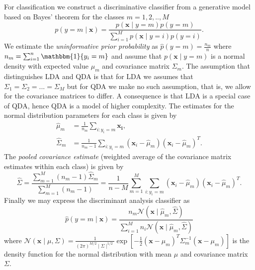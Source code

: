 \documentclass[../../project.tex]{subfiles}
\begin{document}
	For classification we construct a discriminative classifier from a generative model based on Bayes' theorem for the classes $m=1,2,..,M$
	\begin{equation}
	p(y=m \mid \boldsymbol{x}) = \frac{ p(\boldsymbol{x} \mid y=m) p(y=m)}
	{\sum_{i=1}^{M} p(\boldsymbol{x} \mid y=i)p(y=i)}.
	\end{equation}
	We estimate the \textit{uninformative prior probability} as $\hat{p}(y=m) = \frac{n_m}{n}$ where $n_m = \sum_{i=1}^{n} \mathbbm{1}\{y_i=m\}$ and assume that $p(\boldsymbol{x} \mid y=m)$ is a normal density with expected value $\mu_m$ and covariance matrix $\Sigma_m$. The assumption that distinguishes LDA and QDA is that for LDA we assumes that $\Sigma_1=\Sigma_2=...=\Sigma_M$ but for QDA we make no such assumption, that is, we allow for the covariance matrices to differ. A consequence is that LDA is a special case of QDA, hence QDA is a model of higher complexity. The estimates for the normal distribution parameters for each class is given by
	\begin{align}
	\hat{\mu}_m &= \frac{1}{n_m} \sum_{i:y_i=m} \boldsymbol{x_i}, \\
	\hat{\Sigma}_m &= \frac{1}{n_m-1}\sum_{i:y_i=m} (\boldsymbol{x}_i-\hat{\mu}_m)(\boldsymbol{x}_i-\hat{\mu}_m)^T.
	\end{align}
	The \textit{pooled covariance estimate} (weighted average of the covariance matrix estimates within each class) is given by
	\begin{equation}
	\hat{\Sigma} = \frac{\sum_{m=1}^{M} (n_m-1)\hat{\Sigma}_m}{\sum_{m=1}^{M} (n_m-1)}=\frac{1}{n-M}\sum_{m=1}^{M}\sum_{i:y_i=m} (\boldsymbol{x}_i-\hat{\mu}_m)(\boldsymbol{x}_i-\hat{\mu}_m)^T.
	\end{equation}
	Finally we may express the discriminant analysis classifier as
	\begin{equation}
	\hat{p}(y=m \mid \boldsymbol{x}) = \frac{n_m\mathcal{N}(\boldsymbol{x} \mid \hat{\mu}_m, \hat{\Sigma})}{\sum_{i=1}^{M} n_i\mathcal{N}(\boldsymbol{x} \mid \hat{\mu}_m, \hat{\Sigma})}
	\end{equation}
	where $\mathcal{N}(\boldsymbol{x} \mid \mu,\Sigma)=\frac{1}{(2\pi)^{M/2}\mid\Sigma\mid^{1/2}}\exp{[-\frac{1}{2}(\boldsymbol{x}-\mu_m)^T\Sigma_m^{-1}(\boldsymbol{x}-\mu_m)]}$ is the density function for the normal distribution with mean $\mu$ and covariance matrix $\Sigma$.
\end{document}
